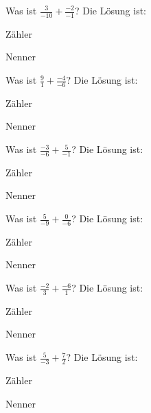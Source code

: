 \documentclass{ximera}
\begin{document}
\begin{shuffle}
\begin{question}
Was ist $\frac{3}{-10} + \frac{-2}{-1}$?
Die Lösung ist:
\begin{solution}
Zähler 
\end{solution}
\begin{solution}
Nenner 
\end{solution}
\end{question}


\begin{question}
Was ist $\frac{9}{1} + \frac{-4}{-6}$?
Die Lösung ist:
\begin{solution}
Zähler 
\end{solution}
\begin{solution}
Nenner 
\end{solution}
\end{question}


\begin{question}
Was ist $\frac{-3}{-6} + \frac{5}{-1}$?
Die Lösung ist:
\begin{solution}
Zähler 
\end{solution}
\begin{solution}
Nenner 
\end{solution}
\end{question}


\begin{question}
Was ist $\frac{5}{-9} + \frac{0}{-6}$?
Die Lösung ist:
\begin{solution}
Zähler 
\end{solution}
\begin{solution}
Nenner 
\end{solution}
\end{question}


\begin{question}
Was ist $\frac{-2}{3} + \frac{-6}{1}$?
Die Lösung ist:
\begin{solution}
Zähler 
\end{solution}
\begin{solution}
Nenner 
\end{solution}
\end{question}


\begin{question}
Was ist $\frac{5}{-3} + \frac{7}{2}$?
Die Lösung ist:
\begin{solution}
Zähler 
\end{solution}
\begin{solution}
Nenner 
\end{solution}
\end{question}



\end{shuffle}
\end{document}

